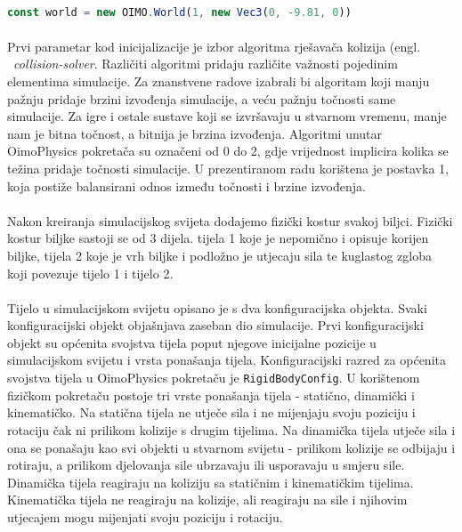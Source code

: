 \documentclass[times, utf8, diplomski]{fer}
\begin{document}
\paragraph{}

\begin{lstlisting}[language=Javascript,caption=Postavljanje simulacijskog svijeta, label=code33-1]
const world = new OIMO.World(1, new Vec3(0, -9.81, 0))
\end{lstlisting}

\paragraph{}
Prvi parametar kod inicijalizacije je izbor algoritma rješavača kolizija (engl. \
\textit{collision-solver}. Različiti algoritmi pridaju različite važnosti pojedinim 
elementima simulacije. Za znanstvene radove izabrali bi algoritam koji manju pažnju pridaje
brzini izvođenja simulacije, a veću pažnju točnosti same simulacije. Za igre i ostale 
sustave koji se izvršavaju u stvarnom vremenu, manje nam je bitna točnost, a bitnija je 
brzina izvođenja. Algoritmi unutar OimoPhysics pokretača su označeni od 0 do 2, gdje 
vrijednost implicira kolika se težina pridaje točnosti simulacije. U prezentiranom radu
korištena je postavka 1, koja postiže balansirani odnos između točnosti i brzine izvođenja.

\paragraph{}
Nakon kreiranja simulacijskog svijeta dodajemo fizički kostur svakoj biljci. Fizički kostur 
biljke sastoji se od 3 dijela. tijela 1 koje je nepomično i opisuje korijen biljke, tijela 2 
koje je vrh biljke i podložno je utjecaju sila te kuglastog zgloba koji povezuje tijelo 1 i
tijelo 2.

\paragraph{}
Tijelo u simulacijskom svijetu opisano je s dva konfiguracijska objekta. Svaki 
konfiguracijski objekt objašnjava zaseban dio simulacije. Prvi konfiguracijski objekt su
općenita svojstva tijela poput njegove inicijalne pozicije u simulacijskom svijetu i vrsta
ponašanja tijela. Konfiguracijski razred za općenita svojstva tijela u OimoPhysics pokretaču 
je \verb#RigidBodyConfig#. U korištenom fizičkom pokretaču postoje tri vrste
ponašanja tijela - statično, dinamički i kinematičko. Na statična tijela ne utječe sila i 
ne mijenjaju svoju poziciju i rotaciju čak ni prilikom kolizije s drugim tijelima. Na 
dinamička tijela utječe sila i ona se ponašaju kao svi objekti u stvarnom svijetu - prilikom 
kolizije se odbijaju i rotiraju, a prilikom djelovanja sile ubrzavaju ili usporavaju u 
smjeru sile. Dinamička tijela reagiraju na koliziju sa statičnim i kinematičkim tijelima. 
Kinematička tijela ne reagiraju na kolizije, ali reagiraju na sile i njihovim utjecajem mogu 
mijenjati svoju poziciju i rotaciju.
\end{document}
